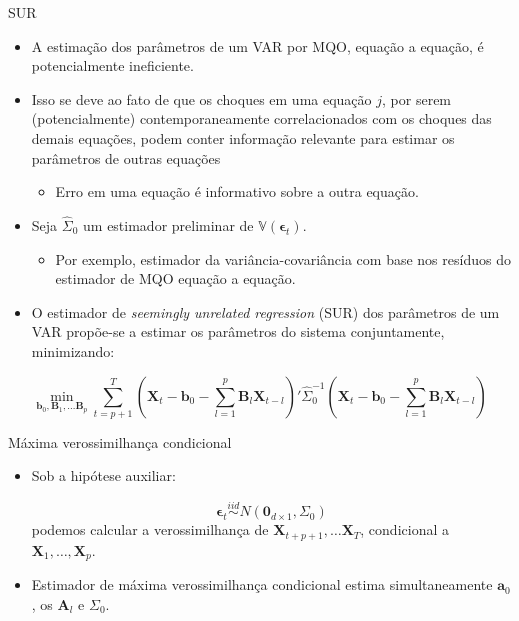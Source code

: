 \documentclass[11pt]{beamer}
\begin{document}
\begin{frame}{SUR}
	\begin{itemize}
		\item A estimação dos parâmetros de um VAR por MQO, equação a equação, é potencialmente ineficiente.
					\item Isso se deve ao fato de que os choques em uma equação $j$, por serem (potencialmente) contemporaneamente correlacionados com os choques das demais equações, podem conter informação relevante para estimar os parâmetros de outras equações
		\begin{itemize}
		\item Erro em uma equação é informativo sobre a outra equação.
		\end{itemize}
		\item Seja $\hat \Sigma_0$ um estimador preliminar de $\mathbb{V}(\boldsymbol{\epsilon}_t)$.
		\begin{itemize}
			\item Por exemplo, estimador da variância-covariância com base nos resíduos do estimador de MQO equação a equação.
		\end{itemize}
		\item O estimador de \textit{seemingly unrelated regression} (SUR) dos parâmetros de um VAR propõe-se a estimar os parâmetros do sistema {\color{blue}conjuntamente}, minimizando:
	\end{itemize}		$$\min_{\boldsymbol{b}_0, \boldsymbol{B}_1,\ldots \boldsymbol{B}_p} \sum_{t=p+1}^T \left(\boldsymbol{X}_t - \boldsymbol{b}_0 -  \sum_{l=1}^p\boldsymbol{B}_l \boldsymbol{X}_{t-l}\right)' \hat \Sigma^{-1}_0 \left(\boldsymbol{X}_t - \boldsymbol{b}_0 -  \sum_{l=1}^p\boldsymbol{B}_l \boldsymbol{X}_{t-l}\right)$$
\end{frame}
\begin{frame}{Máxima verossimilhança condicional}
\begin{itemize}
	\item Sob a hipótese auxiliar:
	
	$$\boldsymbol{\epsilon}_t \overset{iid}{\sim} N(\boldsymbol{0}_{d\times 1}, \Sigma_0)$$
	podemos calcular a verossimilhança de $\boldsymbol{X}_{t+p+1},\ldots \boldsymbol{X}_{T}$, condicional a $\boldsymbol{X}_1,\ldots, \boldsymbol{X}_p$.
	\item Estimador de máxima verossimilhança condicional estima {\color{blue}simultaneamente} $\boldsymbol{a}_0$, os $\boldsymbol{A}_l$  e $\Sigma_0$.
\end{itemize}
\end{frame}
\end{document}
